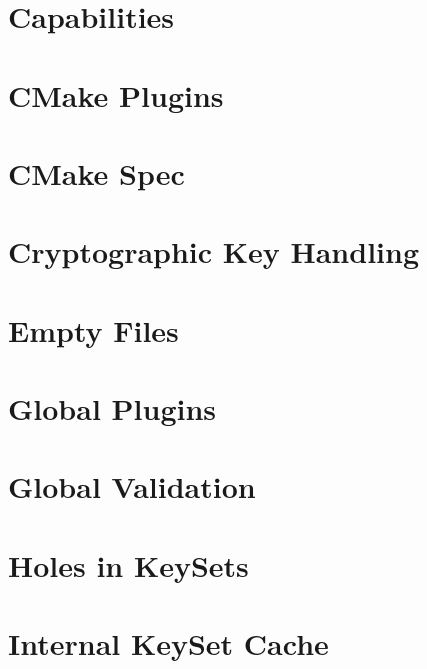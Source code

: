 \documentclass[twoside]{book}
\newcommand{\+}{\discretionary{\mbox{\scriptsize$\hookleftarrow$}}{}{}}
\begin{document}
\chapter{Capabilities}
\label{doc_decisions_capabilities_md}
\hypertarget{doc_decisions_capabilities_md}{}

\chapter{C\+Make Plugins}
\label{doc_decisions_cmake_plugins_md}
\hypertarget{doc_decisions_cmake_plugins_md}{}

\chapter{C\+Make Spec}
\label{doc_decisions_cmake_spec_md}
\hypertarget{doc_decisions_cmake_spec_md}{}

\chapter{Cryptographic Key Handling}
\label{doc_decisions_cryptograhic_key_handling_md}
\hypertarget{doc_decisions_cryptograhic_key_handling_md}{}

\chapter{Empty Files}
\label{doc_decisions_empty_files_md}
\hypertarget{doc_decisions_empty_files_md}{}

\chapter{Global Plugins}
\label{doc_decisions_global_plugins_md}
\hypertarget{doc_decisions_global_plugins_md}{}

\chapter{Global Validation}
\label{doc_decisions_global_validation_md}
\hypertarget{doc_decisions_global_validation_md}{}

\chapter{Holes in Key\+Sets}
\label{doc_decisions_holes_md}
\hypertarget{doc_decisions_holes_md}{}

\chapter{Internal Key\+Set Cache}
\label{doc_decisions_internal_cache_md}
\hypertarget{doc_decisions_internal_cache_md}{}

\end{document}
